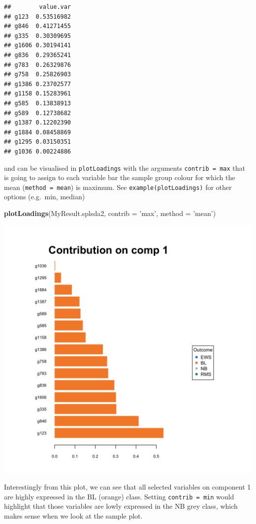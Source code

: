 \documentclass[]{book}
\newenvironment{Shaded}{\begin{snugshade}}{\end{snugshade}}
\newcommand{\DataTypeTok}[1]{\textcolor[rgb]{0.13,0.29,0.53}{#1}}
\newcommand{\KeywordTok}[1]{\textcolor[rgb]{0.13,0.29,0.53}{\textbf{#1}}}
\newcommand{\NormalTok}[1]{#1}
\newcommand{\StringTok}[1]{\textcolor[rgb]{0.31,0.60,0.02}{#1}}
\begin{document}
\begin{verbatim}
##        value.var
## g123  0.53516982
## g846  0.41271455
## g335  0.30309695
## g1606 0.30194141
## g836  0.29365241
## g783  0.26329876
## g758  0.25826903
## g1386 0.23702577
## g1158 0.15283961
## g585  0.13838913
## g589  0.12738682
## g1387 0.12202390
## g1884 0.08458869
## g1295 0.03150351
## g1036 0.00224886
\end{verbatim}

and can be visualised in \texttt{plotLoadings} with the arguments \texttt{contrib\ =\ \textquotesingle{}max\textquotesingle{}} that is going to assign to each variable bar the sample group colour for which the mean (\texttt{method\ =\ \textquotesingle{}mean\textquotesingle{}}) is maximum. See \texttt{example(plotLoadings)} for other options (e.g.~min, median)

\begin{Shaded}
\begin{Highlighting}[]
\KeywordTok{plotLoadings}\NormalTok{(MyResult.splsda2, }\DataTypeTok{contrib =} \StringTok{'max'}\NormalTok{, }\DataTypeTok{method =} \StringTok{'mean'}\NormalTok{)}
\end{Highlighting}
\end{Shaded}

\begin{center}\includegraphics[width=0.75\linewidth,]{Figures/04-splsda-plotLoadings-1} \end{center}

Interestingly from this plot, we can see that all selected variables on component 1 are highly expressed in the BL (orange) class. Setting \texttt{contrib\ =\ \textquotesingle{}min\textquotesingle{}} would highlight that those variables are lowly expressed in the NB grey class, which makes sense when we look at the sample plot.
\end{document}
